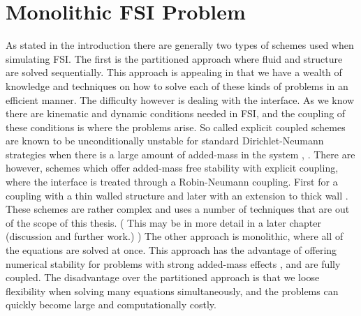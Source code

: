 \section{Monolithic FSI Problem}
As stated in the introduction there are generally two types of schemes used when simulating FSI. The first is the partitioned approach where fluid and structure are solved sequentially.  This approach is appealing in that we have a wealth of knowledge and techniques on how to solve each of these kinds of problems in an efficient manner. The difficulty however is dealing with the interface. As we know there are kinematic and dynamic conditions needed in FSI, and the coupling of these conditions is where the problems arise. So called explicit coupled schemes are known to be unconditionally unstable for standard Dirichlet-Neumann strategies when there is a large amount of added-mass in the system \cite{Fernandez2015}, \cite{VanBrummelen2009}. There are however, schemes which offer added-mass free stability with explicit coupling, where the interface is treated through a Robin-Neumann coupling. First for a coupling with a thin walled structure \cite{Fernandez2013} and later with an extension to thick wall \cite{Fernandez2015}. These schemes are rather complex and uses a number of techniques that are out of the scope of this thesis. ( This may be in more detail in a later chapter (discussion and further work.) ) \newline
The other approach is monolithic, where all of the equations are solved at once. This approach has the advantage of offering numerical stability for problems with strong added-mass effects \cite{Liu2014}, and are fully coupled. The disadvantage over the partitioned approach is that we loose flexibility when solving many equations simultaneously, and the problems can quickly become large and computationally costly. \newline

